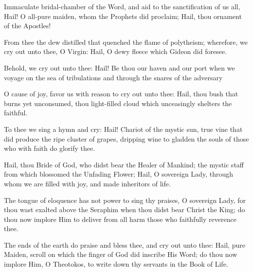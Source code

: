 \documentclass[twoside, letterpaper, 12pt]{report}
\begin{document}
Immaculate bridal-chamber of the Word, and aid to the sanctification of us all,
Hail! O all-pure maiden, whom the Prophets did proclaim;
Hail, thou ornament of the Apostles!


From thee the dew distilled that quenched the flame of polytheism;
wherefore, we cry out unto thee, O Virgin:
Hail, O dewy fleece which Gideon did foresee.


Behold, we cry out unto thee:
Hail! Be thou our haven and our port when we voyage
on the sea of tribulations and through the snares of the adversary


O cause of joy, favor us with reason to cry out unto thee:
Hail, thou bush that burns yet unconsumed,
thou light-filled cloud which unceasingly shelters the faithful.





To thee we sing a hymn and cry: Hail! Chariot of the mystic sun,
true vine that did produce the ripe cluster of grapes,
dripping wine to gladden the souls of those who with faith do glorify thee.


Hail, thou Bride of God, who didst bear the Healer of Mankind;
the mystic staff from which blossomed the Unfading Flower;
Hail, O sovereign Lady, through whom we are filled with joy,
and made inheritors of life.


The tongue of eloquence has not power to sing thy praises,
O sovereign Lady, for thou wast exalted above the Seraphim
when thou didst bear Christ the King;
do thou now implore Him to deliver from all harm
those who faithfully reverence thee.


The ends of the earth do praise and bless thee, and cry out unto thee:
Hail, pure Maiden, scroll on which the finger of God did inscribe His Word;
do thou now implore Him, O Theotokos,
to write down thy servants in the Book of Life.
\end{document}
